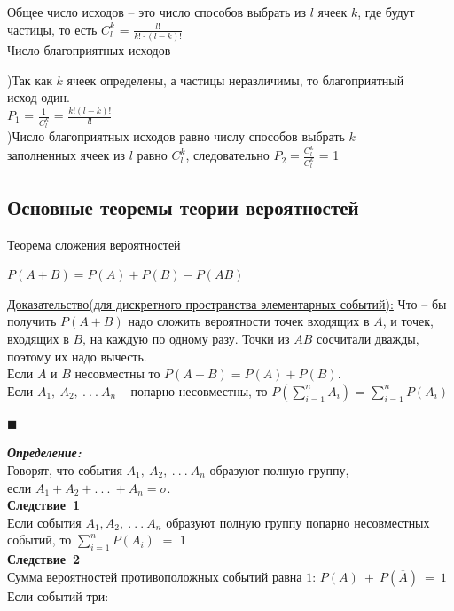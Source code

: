 \documentclass[russian, 12pt, fleqn,x11names]{article}
\begin{document}
Общее число исходов -- это число способов выбрать из $l$ ячеек $k$, где будут частицы, то есть $C^k_l$ = $\frac{l!}{k!\cdot(l - k)!}$\\
Число благоприятных исходов
\begin{tabbing}	
)Так как $k$  ячеек определены, а частицы неразличимы, то благоприятный\\ исход один.\\$P_1$ = $\frac{1}{C^k_l}$ = $\frac{k!(l - k)!}{l!}$\\
)Число благоприятных исходов равно числу способов выбрать $k$\\
 заполненных ячеек из $l$  равно $C^k_l$, следовательно $P_2 = \frac{C^k_l}{C^k_l}$ = 1
\end{tabbing}
\subsection{Основные теоремы теории вероятностей}
$\textbf{Теорема сложения вероятностей}$
\begin{tabbing}
\qquad\qquad$P(A + B) = P(A) + P(B)  -  P(AB)$
\end{tabbing}
\underline{Доказательство(для дискретного пространства элементарных событий):} Что -- бы получить $P(A + B)$ надо сложить вероятности точек входящих в $A$, и точек, входящих в $B$, на каждую по одному разу. Точки из $AB$ сосчитали дважды, поэтому их надо вычесть.\\
Если $A$ и $B$ несовместны то $P(A+B)=P(A)+P(B)$.\\
Если $A_1,\ A_2,\ .\ .\ .\ A_n$ -- попарно несовместны, то $\displaystyle{
P \left( \sum\limits_{i=1}^{n}A_i  \right)
}$ = $\sum\limits_{i=1}^{n}P(A_i)$
\begin{flushright}\(\blacksquare\)\end{flushright}
\textit{\textbf{Определение:}}\\ Говорят, что события $A_1, \ A_2,\ .\ .\ .\ A_n$ образуют полную группу, \\если $A_1+A_2+.\ .\ .\ +A_n=\sigma$.\\
\textbf{Следствие\ 1}\\ Если события $A_1,A_2,\ .\ .\ .\ A_n$ образуют полную группу попарно несовместных событий, то  $\sum\limits_{i=1}^{n}P(A_i)$ $=$ $1$\\
\textbf{Следствие\ 2} \\Сумма вероятностей противоположных событий равна $1$: $P(A)\ +\ P(\overline{A})\ =\ 1$\\
Если событий три:\\
\end{document}
